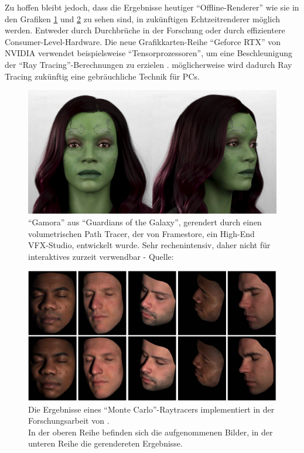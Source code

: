 \documentclass[ngerman,runningheads,a4paper]{llncs}[2018/03/10]
\begin{document}
Zu hoffen bleibt jedoch, dass die Ergebnisse heutiger \enquote{Offline-Renderer} wie sie in den Grafiken \ref{fig:outlook-volumetric-path-tracer} und \ref{fig:outlook-monte-carlo-ray-tracer} zu sehen sind, in zukünftigen Echtzeitrenderer möglich werden.
Entweder durch Durchbrüche in der Forschung oder durch effizientere Consumer-Level-Hardware.
Die neue Grafikkarten-Reihe \enquote{Geforce RTX} von NVIDIA verwendet beispielsweise \enquote{Tensorprozessoren}, um eine Beschleunigung der \enquote{Ray Tracing}-Berechnungen zu erzielen \cite{forbes-tensor-rtx}.
möglicherweise wird dadurch Ray Tracing zukünftig eine gebräuchliche Technik für PCs.

\begin{figure}
\includegraphics[scale=0.25,keepaspectratio]{./images/framestore-digital-gamora.jpg}
\caption{\enquote{Gamora} aus \enquote{Guardians of the Galaxy}, gerendert durch einen volumetrischen Path Tracer, der von Framestore, ein High-End VFX-Studio, entwickelt wurde. Sehr rechenintensiv, daher nicht für interaktives zurzeit verwendbar - Quelle: \cite{volumetric-path-tracer}}
\label{fig:outlook-volumetric-path-tracer}
\end{figure}

\begin{figure}
\includegraphics[scale=0.25,keepaspectratio]{./images/monte-carlo-ray-tracer.jpg}
\caption{Die Ergebnisse eines \enquote{Monte Carlo}-Raytracers implementiert in der Forschungsarbeit von \citet{weyrich2006analysis}.\\\hspace{\textwidth}In der oberen Reihe befinden sich die aufgenommenen Bilder, in der unteren Reihe die gerendereten Ergebnisse.}
\label{fig:outlook-monte-carlo-ray-tracer}
\end{figure}
\end{document}
